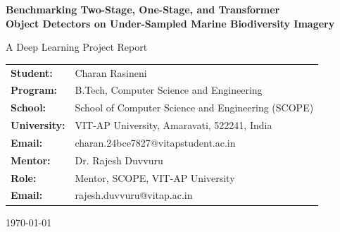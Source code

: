 \documentclass[11pt,a4paper]{article}
\begin{document}
\begin{titlepage}
\begin{center}
\vspace*{1.5cm}
{\LARGE\bfseries Benchmarking Two-Stage, One-Stage, and Transformer\\
\vspace{0.4cm}
Object Detectors on Under-Sampled Marine Biodiversity Imagery\par}
\vspace{1.2cm}
{\large A Deep Learning Project Report\par}
\vspace{1.6cm}

\begin{tabular}{ll}
\textbf{Student:} & Charan Rasineni \\
\textbf{Program:} & B.Tech, Computer Science and Engineering \\
\textbf{School:} & School of Computer Science and Engineering (SCOPE) \\
\textbf{University:} & VIT-AP University, Amaravati, 522241, India \\
\textbf{Email:} & charan.24bce7827@vitapstudent.ac.in \\[0.6cm]
\textbf{Mentor:} & Dr. Rajesh Duvvuru \\
\textbf{Role:} & Mentor, SCOPE, VIT-AP University \\
\textbf{Email:} & rajesh.duvvuru@vitap.ac.in \\
\end{tabular}

\vfill
\vspace{0.8cm}
{\small \today\par}
\end{center}
\end{titlepage}
\end{document}
